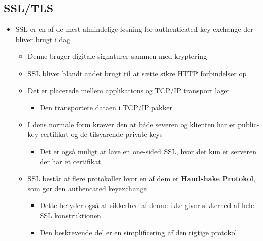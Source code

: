 \documentclass[a4, english]{article}
\begin{document}
\subsection{SSL/TLS}
\begin{itemize}
  \item SSL er en af de mest almindelige løsning for authenticated key-exchange der bliver brugt i dag
  \begin{itemize}
    \item Denne bruger digitale signaturer sammen med kryptering 
	  \item SSL bliver blandt andet brugt til at sætte sikre HTTP forbindelser op 
    \item Det er placerede mellem applikations og TCP/IP transport laget 
    \begin{itemize}
    	\item Den transportere dataen i TCP/IP pakker 
    \end{itemize}
    \item I dens normale form kræver den at både severen og klienten har et public-key certifikat og de tilsvarende private keys   
    \begin{itemize}
    	\item Det er også muligt at lave en one-sided SSL, hvor det kun er serveren der har et certifikat  
    \end{itemize}
    \item SSL består af flere protokoller hvor en af dem er \textbf{Handshake Protokol}, som gør den authencated keyexchange
    \begin{itemize}
    	\item Dette betyder også at sikkerhed af denne ikke giver sikkerhed af hele SSL konstruktionen
      \item Den beskrevende del er en simplificering af den rigtige protokol 
    \end{itemize}
  \end{itemize}
\end{itemize}
\end{document}
